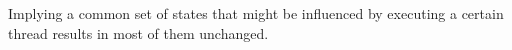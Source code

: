 \noindent
Implying a common set of states that might be influenced by executing a certain thread
results in most of them  unchanged. %
